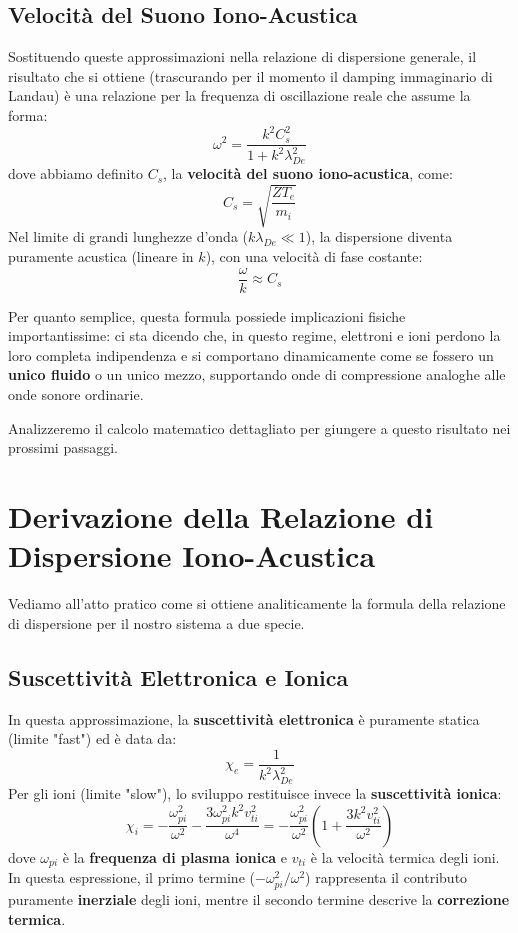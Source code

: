 \subsection{Velocità del Suono Iono-Acustica}
Sostituendo queste approssimazioni nella relazione di dispersione generale, il risultato che si ottiene (trascurando per il momento il damping immaginario di Landau) è una relazione per la frequenza di oscillazione reale che assume la forma:
\begin{equation}
\omega^2 = \frac{k^2 C_s^2}{1 + k^2 \lambda_{De}^2}
\end{equation}
dove abbiamo definito $C_s$, la \textbf{velocità del suono iono-acustica}, come:
\begin{equation}
C_s = \sqrt{\frac{Z T_e}{m_i}}
\end{equation}
Nel limite di grandi lunghezze d'onda ($k \lambda_{De} \ll 1$), la dispersione diventa puramente acustica (lineare in $k$), con una velocità di fase costante:
\begin{equation}
\frac{\omega}{k} \approx C_s
\end{equation}

Per quanto semplice, questa formula possiede implicazioni fisiche importantissime: ci sta dicendo che, in questo regime, elettroni e ioni perdono la loro completa indipendenza e si comportano dinamicamente come se fossero un \textbf{unico fluido} o un unico mezzo, supportando onde di compressione analoghe alle onde sonore ordinarie.

Analizzeremo il calcolo matematico dettagliato per giungere a questo risultato nei prossimi passaggi.

\section{Derivazione della Relazione di Dispersione Iono-Acustica}

Vediamo all'atto pratico come si ottiene analiticamente la formula della relazione di dispersione per il nostro sistema a due specie.

\subsection{Suscettività Elettronica e Ionica}
In questa approssimazione, la \textbf{suscettività elettronica} è puramente statica (limite "fast") ed è data da:
\begin{equation}
\chi_e = \frac{1}{k^2 \lambda_{De}^2}
\end{equation}
Per gli ioni (limite "slow"), lo sviluppo restituisce invece la \textbf{suscettività ionica}:
\begin{equation}
\chi_i = - \frac{\omega_{pi}^2}{\omega^2} - \frac{3 \omega_{pi}^2 k^2 v_{ti}^2}{\omega^4} = - \frac{\omega_{pi}^2}{\omega^2} \left( 1 + \frac{3 k^2 v_{ti}^2}{\omega^2} \right)
\end{equation}
dove $\omega_{pi}$ è la \textbf{frequenza di plasma ionica} e $v_{ti}$ è la velocità termica degli ioni.
In questa espressione, il primo termine ($-\omega_{pi}^2/\omega^2$) rappresenta il contributo puramente \textbf{inerziale} degli ioni, mentre il secondo termine descrive la \textbf{correzione termica}.

